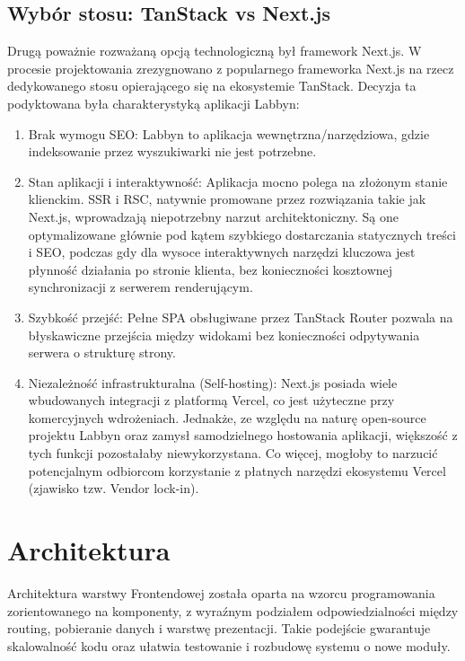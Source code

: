 \subsection{Wybór stosu: TanStack vs Next.js}
\par
Drugą poważnie rozważaną opcją technologiczną był \gls{framework} Next.js.
W procesie projektowania zrezygnowano z popularnego \gls{framework}a Next.js na rzecz dedykowanego stosu opierającego się na ekosystemie TanStack. \cite{tanstack}
Decyzja ta podyktowana była charakterystyką aplikacji \gls{Labbyn}:
\begin{enumerate}
    \item Brak wymogu \gls{SEO}: \gls{Labbyn} to aplikacja wewnętrzna/narzędziowa, gdzie indeksowanie przez wyszukiwarki nie jest potrzebne.
    \item Stan aplikacji i interaktywność: Aplikacja mocno polega na złożonym stanie klienckim. \gls{SSR} i \gls{RSC}, natywnie promowane przez rozwiązania takie jak Next.js, wprowadzają niepotrzebny narzut architektoniczny. Są one optymalizowane głównie pod kątem szybkiego dostarczania statycznych treści i \gls{SEO}, podczas gdy dla wysoce interaktywnych narzędzi kluczowa jest płynność działania po stronie klienta, bez konieczności kosztownej synchronizacji z serwerem renderującym.
    \item Szybkość przejść: Pełne \gls{SPA} obsługiwane przez TanStack Router pozwala na błyskawiczne przejścia między widokami bez konieczności odpytywania serwera o strukturę strony.
    \item Niezależność infrastrukturalna (Self-hosting): Next.js posiada wiele wbudowanych integracji z platformą Vercel, co jest użyteczne przy komercyjnych wdrożeniach. Jednakże, ze względu na naturę \gls{open-source} projektu \gls{Labbyn} oraz zamysł samodzielnego hostowania aplikacji, większość z tych funkcji pozostałaby niewykorzystana. Co więcej, mogłoby to narzucić potencjalnym odbiorcom korzystanie z płatnych narzędzi ekosystemu Vercel (zjawisko tzw. \gls{Vendor lock-in}).
\end{enumerate}

\section{Architektura}
\par
Architektura warstwy \gls{Frontend}owej została oparta na wzorcu programowania zorientowanego na komponenty, z wyraźnym podziałem odpowiedzialności między routing, pobieranie danych i warstwę prezentacji.
Takie podejście gwarantuje skalowalność kodu oraz ułatwia testowanie i rozbudowę systemu o nowe moduły.

